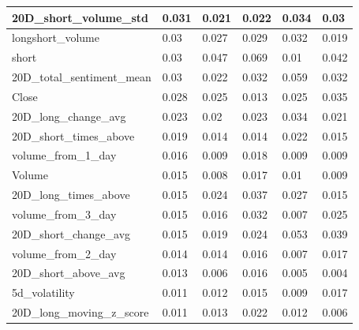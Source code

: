 \documentclass[letterpaper]{article}
\begin{document}
\begin{table}[H]
\begin{tabular}{|l|l|l|l|l|l|}
    20D\_short\_volume\_std             & 0.031        & 0.021        & 0.022        & 0.034        & 0.03         \\ \hline
    longshort\_volume                   & 0.03         & 0.027        & 0.029        & 0.032        & 0.019        \\ \hline
    short                               & 0.03         & 0.047        & 0.069        & 0.01         & 0.042        \\ \hline
    20D\_total\_sentiment\_mean         & 0.03         & 0.022        & 0.032        & 0.059        & 0.032        \\ \hline
    Close                               & 0.028        & 0.025        & 0.013        & 0.025        & 0.035        \\ \hline
    20D\_long\_change\_avg              & 0.023        & 0.02         & 0.023        & 0.034        & 0.021        \\ \hline
    20D\_short\_times\_above            & 0.019        & 0.014        & 0.014        & 0.022        & 0.015        \\ \hline
    volume\_from\_1\_day                & 0.016        & 0.009        & 0.018        & 0.009        & 0.009        \\ \hline
    Volume                              & 0.015        & 0.008        & 0.017        & 0.01         & 0.009        \\ \hline
    20D\_long\_times\_above             & 0.015        & 0.024        & 0.037        & 0.027        & 0.015        \\ \hline
    volume\_from\_3\_day                & 0.015        & 0.016        & 0.032        & 0.007        & 0.025        \\ \hline
    20D\_short\_change\_avg             & 0.015        & 0.019        & 0.024        & 0.053        & 0.039        \\ \hline
    volume\_from\_2\_day                & 0.014        & 0.014        & 0.016        & 0.007        & 0.017        \\ \hline
    20D\_short\_above\_avg              & 0.013        & 0.006        & 0.016        & 0.005        & 0.004        \\ \hline
    5d\_volatility                      & 0.011        & 0.012        & 0.015        & 0.009        & 0.017        \\ \hline
    20D\_long\_moving\_z\_score         & 0.011        & 0.013        & 0.022        & 0.012        & 0.006        \\ \hline

\end{tabular}
\end{table}
\end{document}
